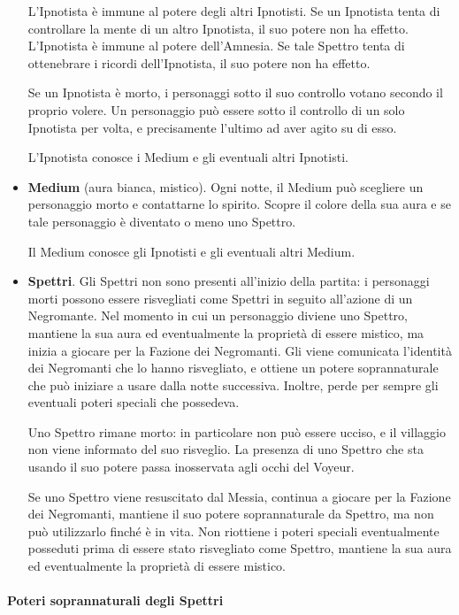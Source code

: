 \documentclass[a4paper,10pt]{article}
\begin{document}
\begin{itemize}
 L'Ipnotista è immune al potere degli altri Ipnotisti. Se un Ipnotista tenta di
controllare la mente di un altro Ipnotista, il suo potere non ha effetto.
 L'Ipnotista è immune al potere dell'Amnesia. Se tale Spettro tenta di
ottenebrare i ricordi dell'Ipnotista, il suo potere non ha effetto.

 Se un Ipnotista è morto, i personaggi sotto il suo controllo votano secondo il
proprio volere.
 Un personaggio può essere sotto il controllo di un solo Ipnotista per volta, e
precisamente l'ultimo ad aver agito su di esso.

 L'Ipnotista conosce i Medium e gli eventuali altri Ipnotisti.

 \item {\bf Medium} (aura bianca, mistico). Ogni notte, il Medium può scegliere
un personaggio morto e contattarne lo spirito. Scopre il colore della sua aura e
se tale personaggio è diventato o meno uno Spettro.

 Il Medium conosce gli Ipnotisti e gli eventuali altri Medium.

 \item {\bf Spettri}. Gli Spettri non sono presenti all'inizio della partita: i
personaggi morti possono essere risvegliati come Spettri in seguito all'azione
di un Negromante.
Nel momento in cui un personaggio diviene uno Spettro, mantiene la sua aura ed
eventualmente la proprietà di essere mistico, ma inizia a giocare per la
Fazione dei Negromanti. Gli viene comunicata l'identità dei Negromanti che lo
hanno risvegliato, e ottiene un potere soprannaturale che può iniziare a usare
dalla notte successiva. Inoltre, perde per sempre gli eventuali poteri speciali
che possedeva.
 
 Uno Spettro rimane morto: in particolare non può essere ucciso, e il villaggio
non viene informato del suo risveglio.
 La presenza di uno Spettro che sta usando il suo potere passa inosservata agli
occhi del Voyeur.
 
 Se uno Spettro viene resuscitato dal Messia, continua a giocare per la Fazione
dei Negromanti, mantiene il suo potere soprannaturale da Spettro, ma non può 
utilizzarlo finché è in vita. Non riottiene i poteri speciali eventualmente
posseduti prima di essere stato risvegliato come Spettro, mantiene la sua aura
ed eventualmente la proprietà di essere mistico.
 
\end{itemize}


\paragraph{Poteri soprannaturali degli Spettri}
\end{document}
